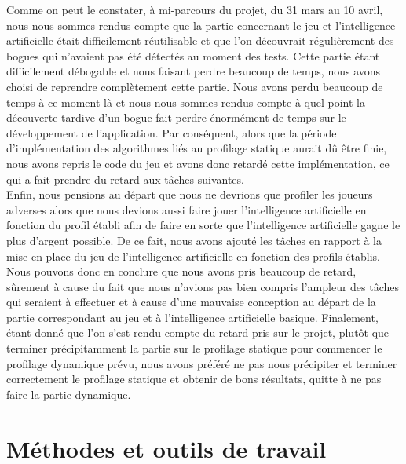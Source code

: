 \documentclass{report}
\begin{document}
Comme on peut le constater, à mi-parcours du projet, du 31 mars au 10 avril, nous nous sommes rendus compte que la partie concernant le jeu et l'intelligence artificielle était difficilement réutilisable et que l'on découvrait régulièrement des bogues qui n'avaient pas été détectés au moment des tests. Cette partie étant difficilement débogable et nous faisant perdre beaucoup de temps, nous avons choisi de reprendre complètement cette partie. Nous avons perdu beaucoup de temps à ce moment-là et nous nous sommes rendus compte à quel point la découverte tardive d'un bogue fait perdre énormément de temps sur le développement de l'application. Par conséquent, alors que la période d'implémentation des algorithmes liés au profilage statique aurait dû être finie, nous avons repris le code du jeu et avons donc retardé cette implémentation, ce qui a fait prendre du retard aux tâches suivantes.\\

Enfin, nous pensions au départ que nous ne devrions que profiler les joueurs adverses alors que nous devions aussi faire jouer l'intelligence artificielle en fonction du profil établi afin de faire en sorte que l'intelligence artificielle gagne le plus d'argent possible. De ce fait, nous avons ajouté les tâches en rapport à la mise en place du jeu de l'intelligence artificielle en fonction des profils établis. \\

Nous pouvons donc en conclure que nous avons pris beaucoup de retard, sûrement à cause du fait que nous n'avions pas bien compris l'ampleur des tâches qui seraient à effectuer et à cause d'une mauvaise conception au départ de la partie correspondant au jeu et à l'intelligence artificielle basique. Finalement, étant donné que l'on s'est rendu compte du retard pris sur le projet, plutôt que terminer précipitamment la partie sur le profilage statique pour commencer le profilage dynamique prévu, nous avons préféré ne pas nous précipiter et terminer correctement le profilage statique et obtenir de bons résultats, quitte à ne pas faire la partie dynamique. \par

\section{Méthodes et outils de travail}
\end{document}

